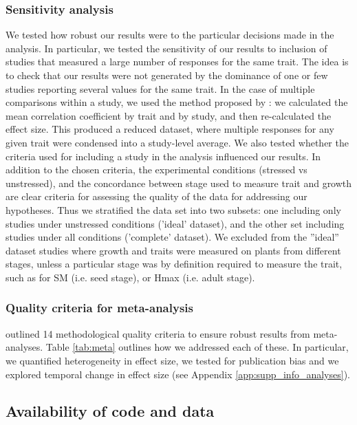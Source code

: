 \documentclass[a4paper,11pt]{article}
\begin{document}
\subsubsection*{Sensitivity analysis}\label{sensitivity-analysis}

We tested how robust our results were to the particular decisions made in the analysis.
In particular, we tested the sensitivity of our results to inclusion of studies that measured a large number of responses for the same trait. The idea is to check that our results were not generated by the dominance of one or few studies reporting several values for the same trait. In the case of multiple comparisons within a study, we used the method proposed by \citet{Borenstein:2009um}: we calculated the mean correlation coefficient by trait and by study, and then re-calculated the effect size. This produced a reduced dataset, where multiple responses for any given trait were condensed into a study-level average.
We also tested whether the criteria used for including a study in the analysis influenced our results. In addition to the chosen criteria, the experimental conditions (stressed vs unstressed), and the concordance between stage used to measure trait and growth are clear criteria for assessing the quality of the data for addressing our hypotheses. Thus we stratified the data set into two subsets: one including only studies under unstressed conditions ('ideal' dataset), and the other set including studies under all conditions ('complete' dataset). We excluded from the ''ideal'' dataset studies where growth and traits were measured on plants from different stages, unless a particular stage was by definition required to measure the trait, such as for SM (i.e. seed stage), or Hmax (i.e. adult stage).


\subsubsection*{Quality criteria for meta-analysis}

\cite{Koricheva:2014ku} outlined 14 methodological quality criteria to ensure robust results from meta-analyses. Table \ref{tab:meta} outlines how we addressed each of these. In particular, we quantified heterogeneity in effect size, we tested for publication bias and we explored temporal change in effect size (see Appendix \ref{app:supp_info_analyses}).

\subsection*{Availability of code and data}\label{code}
\end{document}
